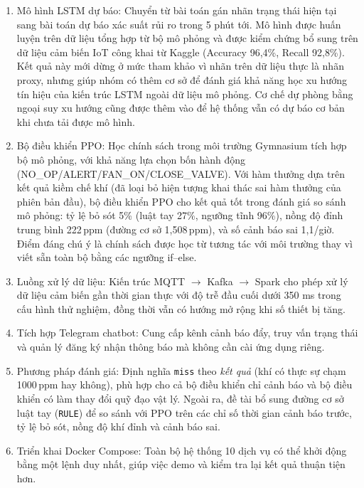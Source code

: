\begin{enumerate}
  \item Mô hình LSTM dự báo: Chuyển từ bài toán gán nhãn trạng thái hiện tại sang bài toán dự báo xác suất rủi ro trong 5 phút tới. Mô hình được huấn luyện trên dữ liệu tổng hợp từ bộ mô phỏng và được kiểm chứng bổ sung trên dữ liệu cảm biến IoT công khai từ Kaggle (Accuracy 96{,}4\%, Recall 92{,}8\%). Kết quả này mới dừng ở mức tham khảo vì nhãn trên dữ liệu thực là nhãn proxy, nhưng giúp nhóm có thêm cơ sở để đánh giá khả năng học xu hướng tín hiệu của kiến trúc LSTM ngoài dữ liệu mô phỏng. Cơ chế dự phòng bằng ngoại suy xu hướng cũng được thêm vào để hệ thống vẫn có dự báo cơ bản khi chưa tải được mô hình.

  \item Bộ điều khiển PPO: Học chính sách trong môi trường Gymnasium tích hợp bộ mô phỏng, với khả năng lựa chọn bốn hành động (NO\_OP/ALERT/FAN\_ON/CLOSE\_VALVE). Với hàm thưởng dựa trên kết quả kiềm chế khí (đã loại bỏ hiện tượng khai thác sai hàm thưởng của phiên bản đầu), bộ điều khiển PPO cho kết quả tốt trong đánh giá so sánh mô phỏng: tỷ lệ bỏ sót 5\% (luật tay 27\%, ngưỡng tĩnh 96\%), nồng độ đỉnh trung bình 222\,ppm (đường cơ sở 1{,}508\,ppm), và số cảnh báo sai 1{,}1/giờ. Điểm đáng chú ý là chính sách được học từ tương tác với môi trường thay vì viết sẵn toàn bộ bằng các ngưỡng if--else.

  \item Luồng xử lý dữ liệu: Kiến trúc MQTT $\rightarrow$ Kafka $\rightarrow$ Spark cho phép xử lý dữ liệu cảm biến gần thời gian thực với độ trễ đầu cuối dưới 350 ms trong cấu hình thử nghiệm, đồng thời vẫn có hướng mở rộng khi số thiết bị tăng.

  \item Tích hợp Telegram chatbot: Cung cấp kênh cảnh báo đẩy, truy vấn trạng thái và quản lý đăng ký nhận thông báo mà không cần cài ứng dụng riêng.

  \item Phương pháp đánh giá: Định nghĩa \texttt{miss} theo \emph{kết quả} (khí có thực sự chạm 1000\,ppm hay không), phù hợp cho cả bộ điều khiển chỉ cảnh báo và bộ điều khiển có làm thay đổi quỹ đạo vật lý. Ngoài ra, đề tài bổ sung đường cơ sở luật tay (\texttt{RULE}) để so sánh với PPO trên các chỉ số thời gian cảnh báo trước, tỷ lệ bỏ sót, nồng độ khí đỉnh và cảnh báo sai.

  \item Triển khai Docker Compose: Toàn bộ hệ thống 10 dịch vụ có thể khởi động bằng một lệnh duy nhất, giúp việc demo và kiểm tra lại kết quả thuận tiện hơn.
\end{enumerate}

